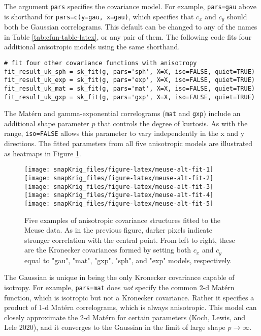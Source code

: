 The argument \texttt{pars} specifies the covariance model. For example, \texttt{pars=\textquotesingle{}gau\textquotesingle{}} above is shorthand for \texttt{pars=c(y=\textquotesingle{}gau\textquotesingle{},\ x=\textquotesingle{}gau\textquotesingle{})}, which specifies that \(c_x\) and \(c_y\) should both be Gaussian correlograms. This default can be changed to any of the names in Table \ref{tab:cfun-table-latex}, or any pair of them. The following code fits four additional anisotropic models using the same shorthand.

\begin{verbatim}
# fit four other covariance functions with anisotropy
fit_result_uk_sph = sk_fit(g, pars='sph', X=X, iso=FALSE, quiet=TRUE)
fit_result_uk_exp = sk_fit(g, pars='exp', X=X, iso=FALSE, quiet=TRUE)
fit_result_uk_mat = sk_fit(g, pars='mat', X=X, iso=FALSE, quiet=TRUE)
fit_result_uk_gxp = sk_fit(g, pars='gxp', X=X, iso=FALSE, quiet=TRUE)
\end{verbatim}

The Matérn and gamma-exponential correlograms (\texttt{\textquotesingle{}mat\textquotesingle{}} and \texttt{\textquotesingle{}gxp\textquotesingle{}}) include an additional shape parameter \(p\) that controls the degree of kurtosis. As with the range, \texttt{iso=FALSE} allows this parameter to vary independently in the x and y directions. The fitted parameters from all five anisotropic models are illustrated as heatmaps in Figure \ref{fig:meuse-alt-fit}.

\begin{figure}[!htb]
\texttt{[image: snapKrig\_files/figure-latex/meuse-alt-fit-1]} \texttt{[image: snapKrig\_files/figure-latex/meuse-alt-fit-2]} \texttt{[image: snapKrig\_files/figure-latex/meuse-alt-fit-3]} \texttt{[image: snapKrig\_files/figure-latex/meuse-alt-fit-4]} \texttt{[image: snapKrig\_files/figure-latex/meuse-alt-fit-5]} \caption{Five examples of anisotropic covariance structures fitted to the Meuse data. As in the previous figure, darker pixels indicate stronger correlation with the central point. From left to right, these are the Kronecker covariances formed by setting both $c_x$ and $c_y$ equal to "gau", "mat", "gxp", "sph", and "exp" models, respectively.}\label{fig:meuse-alt-fit}
\end{figure}

The Gaussian is unique in being the only Kronecker covariance capable of isotropy. For example, \texttt{pars=\textquotesingle{}mat\textquotesingle{}} does \emph{not} specify the common 2-d Matérn function, which is isotropic but not a Kronecker covariance. Rather it specifies a product of 1-d Matérn correlograms, which is always anisotropic. This model can closely approximate the 2-d Matérn for certain parameters (Koch, Lewis, and Lele 2020), and it converges to the Gaussian in the limit of large shape \(p\to\infty\).

